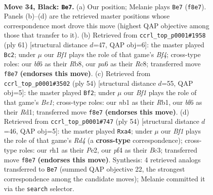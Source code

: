 \documentclass[11pt]{article}
\begin{document}
\clearpage

\begin{figure}[p]\centering
\begin{subfigure}{0.46\textwidth}\centering
\resizebox{\linewidth}{!}{%
\newchessgame
\chessboard[
  setfen={2rk1b2/p1p2p1r/P1p1bBp1/2P4p/1P3P1P/8/8/RN2K2R b Q - 16 34},
  showmover=false,
  pgfstyle=straightmove, color=movearrow, markmove={f8-e7}
]}
\caption{}
\end{subfigure}\hfill
\begin{subfigure}{0.46\textwidth}\centering
\resizebox{\linewidth}{!}{%
\newchessgame
\chessboard[
  setfen={1rr5/4p2k/2p1Ppp1/p4b1p/P1B2P1P/1PP5/7K/R2R4 b - - 0 31},
  showmover=false,
  pgfstyle=straightmove, color=movearrow, markmove={f5-c2}
]}
\caption{}
\end{subfigure}
\\[4pt]
\begin{subfigure}{0.46\textwidth}\centering
\resizebox{\linewidth}{!}{%
\newchessgame
\chessboard[
  setfen={rr4k1/3p2p1/2b1pp2/7p/1nP4P/1P3P2/6P1/1R1RBBK1 w - - 0 28},
  showmover=false,
  pgfstyle=straightmove, color=movearrow, markmove={e1-f2}
]}
\caption{}
\end{subfigure}\hfill
\begin{subfigure}{0.46\textwidth}\centering
\resizebox{\linewidth}{!}{%
\newchessgame
\chessboard[
  setfen={2r2r1k/6p1/3p1b2/3P1p1p/p2RpP2/P1B3P1/1P2P2P/5RK1 w - - 2 28},
  showmover=false,
  pgfstyle=straightmove, color=movearrow, markmove={d4-a4}
]}
\caption{}
\end{subfigure}
\caption{\textbf{Move 34, Black: \texttt{Be7}.} (a) Our position; Melanie plays \texttt{Be7} (\texttt{f8e7}). Panels (b)--(d) are the retrieved master positions whose correspondence most drove this move (highest QAP objective among those that transfer to it). (b) Retrieved from \texttt{ccrl\_top\_p0001\#1958} (ply 61) [structural distance $d$=47, QAP obj=6]: the master played \texttt{Bc2}; under $\mu$ our \emph{Bf1} plays the role of that game's \emph{Bf4}; cross-type roles: our \emph{b}f6 as their \emph{R}b8, our \emph{p}a6 as their \emph{R}c8; transferred move \texttt{f8e7} \textbf{(endorses this move)}. (c) Retrieved from \texttt{ccrl\_top\_p0001\#3502} (ply 54) [structural distance $d$=55, QAP obj=5]: the master played \texttt{Bf2}; under $\mu$ our \emph{Bf1} plays the role of that game's \emph{Be1}; cross-type roles: our \emph{n}b1 as their \emph{R}b1, our \emph{b}f6 as their \emph{R}d1; transferred move \texttt{f8e7} \textbf{(endorses this move)}. (d) Retrieved from \texttt{ccrl\_top\_p0001\#747} (ply 54) [structural distance $d$=46, QAP obj=5]: the master played \texttt{Rxa4}; under $\mu$ our \emph{Bf1} plays the role of that game's \emph{Rd4} (a \textbf{cross-type} correspondence); cross-type roles: our \emph{r}h1 as their \emph{P}e2, our \emph{p}f4 as their \emph{B}c3; transferred move \texttt{f8e7} \textbf{(endorses this move)}. Synthesis: 4 retrieved analogs transferred to \texttt{Be7} (summed QAP objective 22, the strongest correspondence among the candidate moves); Melanie committed it via the \texttt{search} selector.}
\label{fig:thought-m67}
\end{figure}
\end{document}
